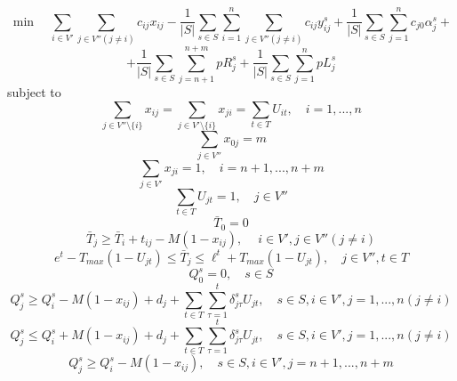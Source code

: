 \documentclass[preprint,11pt,authoryear]{elsarticle}
\begin{document}
$$
 \min \quad  \sum_{i \in V'} \sum_{j \in V'' (j\neq i)} c_{ij} {x}_{ij} - \frac{1}{|S|} \sum_{s \in S} \sum_{i=1}^n \sum_{j \in V''(j\neq i)} c_{ij} {y}_{ij}^s + \frac{1}{|S|} \sum_{s \in S} \sum_{j=1}^n  c_{j0} \alpha_j^s + 
$$
\begin{equation}\label{of}
+ \frac{1}{|S|} \sum_{s \in S} \sum_{j=n+1}^{n+m}  p R_j^s + \frac{1}{|S|} \sum_{s \in S} \sum_{j=1}^n p L_j^s
\end{equation}
subject to
%
\begin{equation}\label{c1}
    \sum_{j \in V''\setminus\{i\}} x_{ij} = \sum_{j \in V'\setminus\{i\}}x_{ji} = \sum_{t\in T}U_{it}, \quad i=1,...,n 
\end{equation}
%
\begin{equation}\label{c2}
    \sum_{j \in V''}x_{0j} = m 
\end{equation}
%
\begin{equation}\label{c3}
    \sum_{j \in V'} x_{ji} = 1, \quad i=n+1,...,n+m 
\end{equation}
%
\begin{equation}\label{c4}
  \sum_{t\in T}U_{jt}=1, \quad j\in V''
\end{equation}
%
\begin{equation}\label{c5}
    \bar{T}_0=0 
\end{equation}
%
\begin{equation}\label{c5'}
    \bar{T}_j \geq \bar{T}_i + t_{ij}-M(1-x_{ij}), \quad \ i \in V', j \in V''(j \neq i)
\end{equation}
%
\begin{equation}\label{c6}
  e^t - T_{max} (1-U_{jt}) \leq \bar{T}_j \leq \ell^t + T_{max} (1-U_{jt}), \quad j \in V'', t \in T
\end{equation}
%
\begin{equation}\label{c7}
    Q_0^s =0, \quad  s \in S
\end{equation}
%
\begin{equation}\label{c8}
    Q_j^s \geq Q_i^s -M(1-x_{ij})+ d_j +\sum_{t\in T}\sum_{\tau=1}^t\delta_{j\tau}^sU_{jt}, \quad s \in S, i\in V', j=1,...,n  (j\neq i) 
\end{equation}
%
\begin{equation}\label{c8.1}
    Q_j^s \leq Q_i^s + M(1-x_{ij})+ d_j +\sum_{t\in T}\sum_{\tau=1}^t\delta_{j\tau}^sU_{jt}, \quad s \in S, i\in V', j=1,...,n  (j\neq i) 
\end{equation}
%
\begin{equation}\label{c9}
    Q_j^s \geq Q_i^s -M(1-x_{ij}), \quad s \in S, i\in V', j=n+1,...,n+m 
\end{equation}
\end{document}
